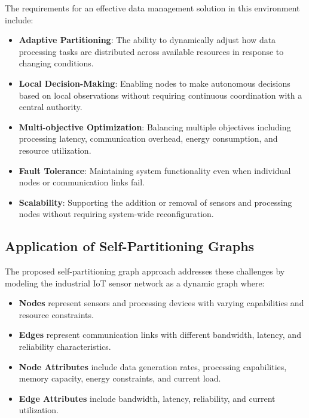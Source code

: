 \documentclass{article}
\begin{document}
The requirements for an effective data management solution in this environment include:

\begin{itemize}
    \item \textbf{Adaptive Partitioning}: The ability to dynamically adjust how data processing tasks are distributed across available resources in response to changing conditions.
    
    \item \textbf{Local Decision-Making}: Enabling nodes to make autonomous decisions based on local observations without requiring continuous coordination with a central authority.
    
    \item \textbf{Multi-objective Optimization}: Balancing multiple objectives including processing latency, communication overhead, energy consumption, and resource utilization.
    
    \item \textbf{Fault Tolerance}: Maintaining system functionality even when individual nodes or communication links fail.
    
    \item \textbf{Scalability}: Supporting the addition or removal of sensors and processing nodes without requiring system-wide reconfiguration.
\end{itemize}

\subsection{Application of Self-Partitioning Graphs}

The proposed self-partitioning graph approach addresses these challenges by modeling the industrial IoT sensor network as a dynamic graph where:

\begin{itemize}
    \item \textbf{Nodes} represent sensors and processing devices with varying capabilities and resource constraints.
    
    \item \textbf{Edges} represent communication links with different bandwidth, latency, and reliability characteristics.
    
    \item \textbf{Node Attributes} include data generation rates, processing capabilities, memory capacity, energy constraints, and current load.
    
    \item \textbf{Edge Attributes} include bandwidth, latency, reliability, and current utilization.
\end{itemize}
\end{document}
